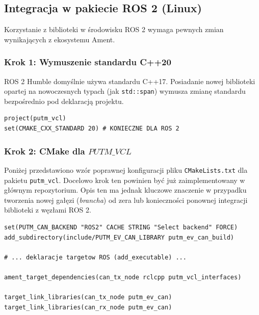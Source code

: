 \documentclass[a4paper,11pt]{article}
\begin{document}
\vspace{1em}

\begin{ros2box}
\subsection*{Integracja w pakiecie ROS 2 (Linux)}

Korzystanie z biblioteki w środowisku ROS 2 wymaga pewnych zmian wynikających z ekosystemu Ament.

\subsubsection*{Krok 1: Wymuszenie standardu C++20}
ROS 2 Humble domyślnie używa standardu C++17. Posiadanie nowej biblioteki opartej na nowoczesnych typach (jak \texttt{std::span}) wymusza zmianę standardu bezpośrednio pod deklaracją projektu.

\begin{lstlisting}[style=cmakestyle]
project(putm_vcl)
set(CMAKE_CXX_STANDARD 20) # KONIECZNE DLA ROS 2
\end{lstlisting}

\subsubsection*{Krok 2: CMake dla $PUTM\_VCL$}
Poniżej przedstawiono wzór poprawnej konfiguracji pliku \texttt{CMakeLists.txt} dla pakietu \texttt{putm\_vcl}. Docelowo krok ten powinien być już zaimplementowany w głównym repozytorium. Opis ten ma jednak kluczowe znaczenie w przypadku tworzenia nowej gałęzi (\textit{brancha}) od zera lub konieczności ponownej integracji biblioteki z węzłami ROS 2.

\begin{lstlisting}[style=cmakestyle]
set(PUTM_CAN_BACKEND "ROS2" CACHE STRING "Select backend" FORCE)
add_subdirectory(include/PUTM_EV_CAN_LIBRARY putm_ev_can_build)

# ... deklaracje targetow ROS (add_executable) ...

ament_target_dependencies(can_tx_node rclcpp putm_vcl_interfaces)

target_link_libraries(can_tx_node putm_ev_can)
target_link_libraries(can_rx_node putm_ev_can)
\end{lstlisting}
\end{ros2box}

\newpage

\end{document}
